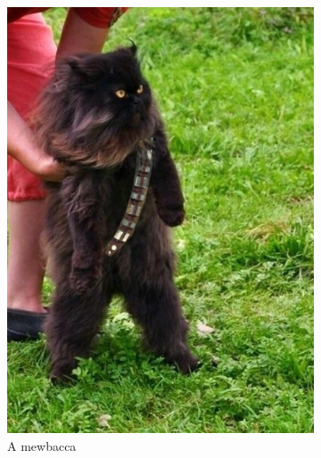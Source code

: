 \documentclass[12pt,a4paper]{article}
\begin{document}
    \begin{figure}[ht!]
            \centering
            \begin{subfigure}[b]{0.3\textwidth}
                    \includegraphics[width=\textwidth]{mewbacca.jpg}
                    \caption{A mewbacca}
                    \label{fig:mewsub1}
            \end{subfigure}
            ~ 
            \begin{subfigure}[b]{0.3\textwidth}

\end{subfigure}
\end{figure}
\end{document}
